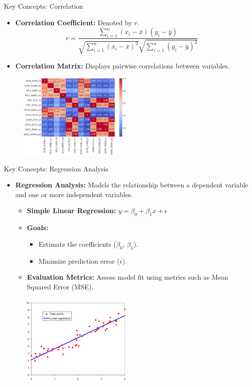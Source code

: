 \documentclass{beamer}
\begin{document}
\begin{frame}{Key Concepts: Correlation}
\begin{itemize}
    \item \textbf{Correlation Coefficient:} Denoted by $r$.
    $$ r = \frac{\sum_{i=1}^{n} (x_i - \bar{x})(y_i - \bar{y})}{\sqrt{\sum_{i=1}^{n} (x_i - \bar{x})^2} \sqrt{\sum_{i=1}^{n} (y_i - \bar{y})^2}} $$
    \item \textbf{Correlation Matrix:} Displays pairwise correlations between variables.
\end{itemize}
\begin{figure}
    \centering
    \includegraphics[width=0.5\textwidth]{imgs/correlation.png}
\end{figure}
\end{frame}


\begin{frame}{Key Concepts: Regression Analysis}
\begin{itemize}
    \item \textbf{Regression Analysis:} Models the relationship between a dependent variable and one or more independent variables.
    \begin{itemize}
        \item \textbf{Simple Linear Regression:} $y = \beta_0 + \beta_1 x + \epsilon$
        \item \textbf{Goals:}
        \begin{itemize}
            \item Estimate the coefficients ($\beta_0$, $\beta_1$).
            \item Minimize prediction error ($\epsilon$).
        \end{itemize}
        \item \textbf{Evaluation Metrics:} Assess model fit using metrics such as Mean Squared Error (MSE).
    \end{itemize}
\end{itemize}
\begin{figure}
    \centering
    \includegraphics[width=0.5\textwidth]{imgs/regression.png}
\end{figure}
\end{frame}
\end{document}
